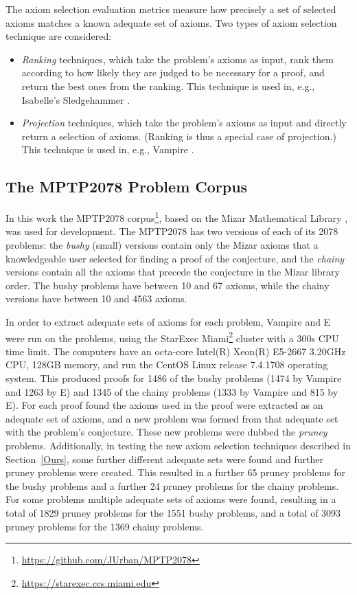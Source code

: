 \documentclass[EPiC]{easychair}
\begin{document}
The axiom selection evaluation metrics measure how precisely a set of
selected axioms matches a known adequate set of axioms.
Two types of axiom selection technique are considered:
\begin{itemize}
\item \emph{Ranking} techniques, which take the problem's axioms as input, 
      rank them according to how likely they are judged to be necessary for 
      a proof, and return the best ones from the ranking.
      This technique is used in, e.g., Isabelle's Sledgehammer \cite{PB10}.
\item \emph{Projection} techniques, which take the problem's axioms as input 
      and directly return a selection of axioms.
      (Ranking is thus a special case of projection.)
      This technique is used in, e.g., Vampire \cite{HV11}.
\end{itemize}

\subsection{The MPTP2078 Problem Corpus}
\label{MPTP2078}

In this work the MPTP2078 corpus\footnote{%
\url{https://github.com/JUrban/MPTP2078}}, based on the Mizar Mathematical
Library \cite{Rud92}, was used for development.
The MPTP2078 has two versions of each of its 2078 problems: 
the \emph{bushy} (small) versions contain only the Mizar axioms that a
knowledgeable user selected for finding a proof of the conjecture, and 
the \emph{chainy} versions contain all the axioms that precede the conjecture
in the Mizar library order.
The bushy problems have between 10 and 67 axioms, while the chainy versions
have between 10 and 4563 axioms.

In order to extract adequate sets of axioms for each problem, Vampire
and E \cite{SCV19} were run on the problems, using the StarExec \cite{SST14}
Miami\footnote{%
\url{https://starexec.ccs.miami.edu}}
cluster with a 300s CPU time limit.
The computers have an octa-core Intel(R) Xeon(R) E5-2667 3.20GHz CPU,
128GB memory, and run the CentOS Linux release 7.4.1708 operating system.
This produced proofs for 1486 of the bushy problems (1474 by Vampire and 1263
by E) and 1345 of the chainy problems (1333 by Vampire and 815 by E).
For each proof found the axioms used in the proof were extracted as an
adequate set of axioms, and a new problem was formed from that adequate
set with the problem's conjecture.
These new problems were dubbed the \emph{pruney} problems.
Additionally, in testing the new axiom selection techniques described in 
Section~\ref{Ours}, some further different adequate sets were found and 
further pruney problems were created.
This resulted in a further 65 pruney problems for the bushy problems and
a further 24 pruney problems for the chainy problems.
For some problems multiple adequate sets of axioms were found, resulting in
a total of 1829 pruney problems for the 1551 bushy problems, and a total of
3093 pruney problems for the 1369 chainy problems.
\end{document}
